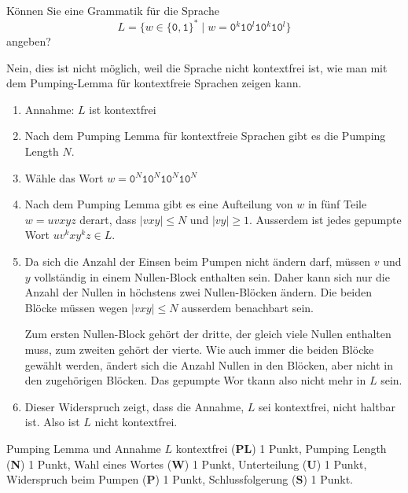 Können Sie eine Grammatik für die Sprache
\[
L = \{
w\in\{\texttt{0},\texttt{1}\}^*
\;|\;
w =
\texttt{0}^k
\texttt{1}
\texttt{0}^l
\texttt{1}
\texttt{0}^k
\texttt{1}
\texttt{0}^l
\}
\]
angeben?


\begin{loesung}
Nein, dies ist nicht möglich, weil die Sprache nicht kontextfrei ist, wie
man mit dem Pumping-Lemma für kontextfreie Sprachen zeigen kann.
\begin{enumerate}
\item
Annahme: $L$ ist kontextfrei
\item
Nach dem Pumping Lemma für kontextfreie Sprachen gibt es die Pumping Length $N$.
\item
Wähle das Wort $w=
\texttt{0}^N
\texttt{1}
\texttt{0}^N
\texttt{1}
\texttt{0}^N
\texttt{1}
\texttt{0}^N$
\item
Nach dem Pumping Lemma gibt es eine Aufteilung von $w$ in fünf Teile
$w=uvxyz$ derart, dass $|vxy| \le N$ und $|vy|\ge 1$.
Ausserdem ist jedes gepumpte Wort $uv^kxy^kz\in L$.
\item
Da sich die Anzahl der Einsen beim Pumpen nicht ändern darf, müssen
$v$ und $y$ vollständig in einem Nullen-Block enthalten sein.
Daher kann sich nur die Anzahl der Nullen in höchstens zwei Nullen-Blöcken
ändern.
Die beiden Blöcke müssen wegen $|vxy|\le N$ ausserdem benachbart sein.

Zum ersten Nullen-Block gehört der dritte, der gleich viele Nullen
enthalten muss, zum zweiten gehört der vierte.
Wie auch immer die beiden Blöcke gewählt werden, ändert sich die Anzahl
Nullen in den Blöcken, aber nicht in den zugehörigen Blöcken.
Das gepumpte Wor tkann also nicht mehr in $L$ sein.
\item
Dieser Widerspruch zeigt, dass die Annahme, $L$ sei kontextfrei, nicht
haltbar ist.
Also ist $L$ nicht kontextfrei.
\qedhere
\end{enumerate}
\end{loesung}

\begin{bewertung}
Pumping Lemma und Annahme $L$ kontextfrei ({\bf PL}) 1 Punkt,
Pumping Length ({\bf N}) 1 Punkt,
Wahl eines Wortes ({\bf W}) 1 Punkt,
Unterteilung ({\bf U}) 1 Punkt,
Widerspruch beim Pumpen ({\bf P}) 1 Punkt,
Schlussfolgerung ({\bf S}) 1 Punkt.
\end{bewertung}

